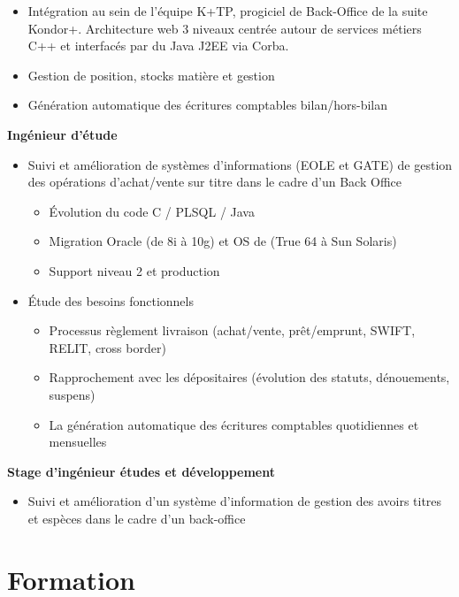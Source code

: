 \documentclass[11pt,a4paper]{moderncv}
\begin{document}
{\bigskip
			\begin{itemize}
				\item Intégration au sein de l’équipe K+TP, progiciel de Back-Office de la suite Kondor+. Architecture web 3 niveaux centrée autour de services métiers C++ et interfacés par du Java J2EE via Corba.
				\item Gestion de position, stocks matière et gestion
				\item Génération automatique des écritures comptables bilan/hors-bilan
			\end{itemize}
}

\newpage

{
	\bigskip
	\textbf{Ingénieur d'étude}
\bigskip
\begin{itemize}
\item Suivi et amélioration de systèmes d’informations (EOLE et GATE) de gestion des opérations d’achat/vente sur titre dans le cadre d’un Back Office
	\begin{itemize}
		\item Évolution du code C / PLSQL / Java
		\item Migration Oracle (de 8i à 10g) et OS de (True 64 à Sun Solaris)
		\item Support niveau 2 et production
\end{itemize}
\bigskip
\item Étude des besoins fonctionnels
	\begin{itemize}
		\item Processus règlement livraison (achat/vente, prêt/emprunt, SWIFT, RELIT, cross border)
		\item Rapprochement avec les dépositaires (évolution des statuts, dénouements, suspens)
		\item La génération automatique des écritures comptables quotidiennes et mensuelles
	\end{itemize}
\end{itemize}
}
\bigskip
{}
{
\bigskip
\textbf{Stage d’ingénieur études et développement}
\bigskip
\begin{itemize}
	\item Suivi et amélioration d’un système d’information de gestion des avoirs titres et espèces dans le cadre d’un back-office
\end{itemize}
}
\section{Formation}
\end{document}

